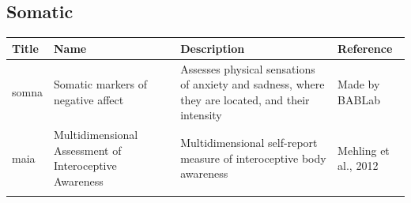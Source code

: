 \documentclass[]{book}
\begin{document}
\hypertarget{somatic}{%
\subsection{Somatic}\label{somatic}}

\begin{longtable}[]{@{}llll@{}}
\toprule
\begin{minipage}[b]{0.22\columnwidth}\raggedright
Title\strut
\end{minipage} & \begin{minipage}[b]{0.27\columnwidth}\raggedright
Name\strut
\end{minipage} & \begin{minipage}[b]{0.22\columnwidth}\raggedright
Description\strut
\end{minipage} & \begin{minipage}[b]{0.18\columnwidth}\raggedright
Reference\strut
\end{minipage}\tabularnewline
\midrule
\endhead
\begin{minipage}[t]{0.22\columnwidth}\raggedright
somna\strut
\end{minipage} & \begin{minipage}[t]{0.27\columnwidth}\raggedright
Somatic markers of negative affect\strut
\end{minipage} & \begin{minipage}[t]{0.22\columnwidth}\raggedright
Assesses physical sensations of anxiety and sadness, where they are located, and their intensity\strut
\end{minipage} & \begin{minipage}[t]{0.18\columnwidth}\raggedright
Made by BABLab\strut
\end{minipage}\tabularnewline
\begin{minipage}[t]{0.22\columnwidth}\raggedright
maia\strut
\end{minipage} & \begin{minipage}[t]{0.27\columnwidth}\raggedright
Multidimensional Assessment of Interoceptive Awareness\strut
\end{minipage} & \begin{minipage}[t]{0.22\columnwidth}\raggedright
Multidimensional self-report measure of interoceptive body awareness\strut
\end{minipage} & \begin{minipage}[t]{0.18\columnwidth}\raggedright
Mehling et al., 2012\strut
\end{minipage}\tabularnewline
\begin{minipage}[t]{0.22\columnwidth}\raggedright

\end{minipage}
\end{longtable}
\end{document}
